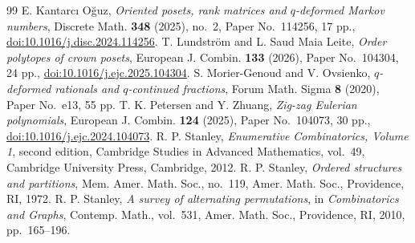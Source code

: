 \documentclass[10pt,a4paper]{amsart}
\begin{document}
\begin{thebibliography}{99}
 E. Kantarc{\i} O\u{g}uz, \emph{Oriented posets, rank matrices and \(q\)-deformed Markov numbers}, Discrete Math. \textbf{348} (2025), no.~2, Paper No.~114256, 17 pp., \href{https://doi.org/10.1016/j.disc.2024.114256}{doi:10.1016/j.disc.2024.114256}.
 T. Lundstr\"om and L. Saud Maia Leite, \emph{Order polytopes of crown posets}, European J. Combin. \textbf{133} (2026), Paper No.~104304, 24 pp., \href{https://doi.org/10.1016/j.ejc.2025.104304}{doi:10.1016/j.ejc.2025.104304}.
 S. Morier-Genoud and V. Ovsienko, \emph{\(q\)-deformed rationals and \(q\)-continued fractions}, Forum Math. Sigma \textbf{8} (2020), Paper No.~e13, 55 pp.
 T. K. Petersen and Y. Zhuang, \emph{Zig-zag Eulerian polynomials}, European J. Combin. \textbf{124} (2025), Paper No.~104073, 30 pp., \href{https://doi.org/10.1016/j.ejc.2024.104073}{doi:10.1016/j.ejc.2024.104073}.
 R. P. Stanley, \emph{Enumerative Combinatorics, Volume 1}, second edition, Cambridge Studies in Advanced Mathematics, vol.~49, Cambridge University Press, Cambridge, 2012.
 R. P. Stanley, \emph{Ordered structures and partitions}, Mem. Amer. Math. Soc., no.~119, Amer. Math. Soc., Providence, RI, 1972.
 R. P. Stanley, \emph{A survey of alternating permutations}, in \emph{Combinatorics and Graphs}, Contemp. Math., vol.~531, Amer. Math. Soc., Providence, RI, 2010, pp.~165--196.
\end{thebibliography}
\end{document}
